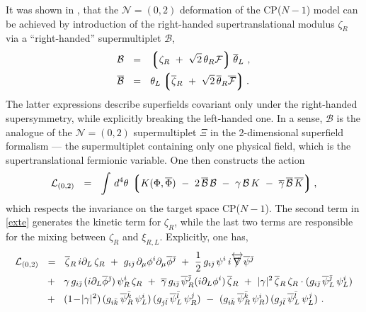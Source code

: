 \documentclass[12pt]{article}
\def\beq{\begin{equation}}
\def\eeq{\end{equation}}
\newcommand{\ntwoo}{${\mathcal N}= \left(0,2\right) $ }
\newcommand{\p}{\partial}
\newcommand{\ov}{\overline}
\newcommand{\mc}[1]{\mathcal{#1}}
\newcommand{\lgr}{\left\lgroup}
\newcommand{\rgr}{\right\rgroup}
\def\slashed#1{\setbox0=\hbox{$#1$}             %
   \dimen0=\wd0                                 %
   \setbox1=\hbox{/} \dimen1=\wd1               %
   \ifdim\dimen0>\dimen1                        %
      \rlap{\hbox to \dimen0{\hfil/\hfil}}      %
      #1                                        %
   \else                                        %
      \rlap{\hbox to \dimen1{\hfil$#1$\hfil}}   %
      /                                         %
   \fi}                                        %
\newcommand{\bzr}{\ov{\zeta}{}_R}
\newcommand{\zr}{\zeta_R}
\begin{document}
	It was shown in \cite{SYhet}, that the \ntwoo deformation of the CP($N-1$) model can be achieved by
	introduction of the right-handed supertranslational modulus $ \zeta_R $ via a ``right-handed'' 
	supermultiplet $ \mc{B} $,
\begin{align*}
%
	\mc{B} & ~~=~~ \lgr \zr ~+~ \sqrt{2}\,\theta_R\mc{F} \rgr \ov{\theta}{}_L~, \\
%
	\ov{\mc{B}} & ~~=~~ \theta_L \lgr \bzr ~+~ \sqrt{2}\, \ov{\theta}{}_R \ov{\mc{F}} \rgr.
\end{align*}
	The latter expressions describe superfields covariant only under the right-handed supersymmetry, 
	while explicitly breaking the left-handed one.
	In a sense, $ \mc{B} $ is the analogue of the \ntwoo supermultiplet $\Xi$ in the 2-dimensional 
	superfield formalism \cite{Edalati} ---
	the supermultiplet containing only one physical field, which is the supertranslational
	fermionic variable.
	One then constructs the action 
\beq
\label{exte}
	\mc{L}_{(0,2)} ~~=~~ \int\, d^4\theta\, \lgr K(\Phi,\ov{\Phi}) 
		~-~ 2\, \ov{\mc{B}}\,\mc{B}  ~-~  \gamma\,\mc{B}\,K  ~-~ \ov{\gamma}\,\ov{\mc{B}}\,\ov{K} \rgr,
\eeq
	which respects the invariance on the target space CP($N-1$).
	The second term in \eqref{exte} generates the kinetic term for $ \zr $, while the last two terms 
	are responsible for the mixing between $ \zr $ and $ \xi_{R,L} $.
	Explicitly, one has,
\begin{align}
%
\notag
	\mc{L}_{(0,2)} & ~~=~~  \bzr\, i\p_L\, \zr 
			~+~ g_{i\bj}\,\p_\mu \phi^i \p_\mu\ov{\phi}{}^\bj
			~+~ \frac{1}{2}\, g_{i\bj}\, \psi^i\, i\overleftrightarrow{\slashed{\nabla}} \ov{\psi}{}^\bj 
	\\
%
\label{cpn-1g}
			& 
			~~+~~ \gamma\, g_{i\bj}\, (i \p_L \ov{\phi}{}^\bj)\, \psi_R^i\, \zr
			~+~ \ov{\gamma}\, g_{i\bj}\, \ov{\psi}{}_R^\bj (i \p_L \phi^i)\, \bzr
			~+~ |\gamma|^2\, \bzr\,\zr \cdot ( g_{i\bj}\, \ov{\psi}{}_L^\bj\, \psi_L^i )
	\\
%
\notag
			& 
			~~+~~ (1 \!-\! |\gamma|^2)\, (g_{i\bk}\, \ov{\psi}{}_R^\bk\, \psi_L^i)\,
						     (g_{j\bl}\, \ov{\psi}{}_L^\bl\, \psi_R^j)
			~-~ (g_{i\bk}\, \ov{\psi}{}_R^\bk\, \psi_R^i)\, (g_{j\bl}\, \ov{\psi}{}_L^\bl\, \psi_L^j)~.
\end{align}
	
\end{document}
